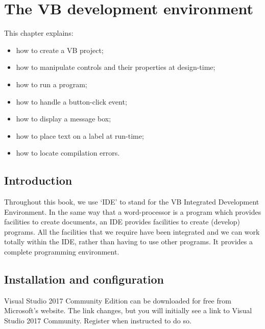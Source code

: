 \chapter{The VB development environment}
\label{ch:visual-studio}

	This chapter explains:
	\begin{itemize}
		\item how to create a VB project;
		\item	how to manipulate controls and their properties at design-time;
		\item	how to run a program;
		\item	how to handle a button-click event;
		\item	how to display a message box;
		\item	how to place text on a label at run-time;
		\item	how to locate compilation errors.
	\end{itemize}
	\section{Introduction}
		Throughout this book, we use ‘IDE’ to stand for the VB Integrated Development Environment. In the same way that a word-processor is a program which provides facilities to create documents, an IDE provides facilities to create (develop) programs. All the facilities that we require have been integrated and we can work totally within the IDE, rather than having to use other programs. It provides a complete programming environment.
	\section{Installation and configuration}
		Visual Studio 2017 Community Edition can be downloaded for free from Microsoft’s website. The link changes, but you will initially see a link to Visual Studio 2017 Community. Register when instructed to do so.

